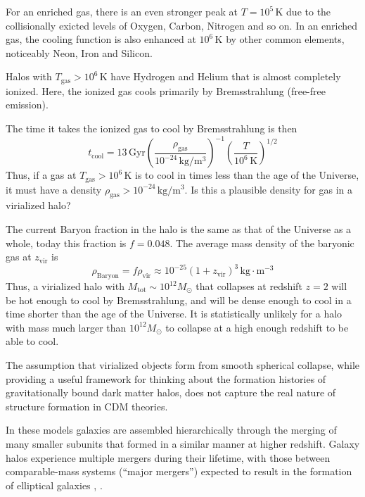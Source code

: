 \par For an enriched gas, there is an even stronger peak at $T=10^{5}\,\text{K}$ due to the collisionally exicted levels of Oxygen, Carbon, Nitrogen and so on. In an enriched gas, the cooling function is also enhanced at $10^{6}\,\text{K}$ by other common elements, noticeably
Neon, Iron and Silicon.
\par Halos with $T_{\text{gas}}>10^{6}\,\text{K}$ have Hydrogen and Helium that is almost completely ionized. Here, the ionized gas cools primarily by Bremsstrahlung (free-free emission).
\par The time it takes the ionized gas to cool by Bremsstrahlung is then 
\begin{equation}
    t_{\text{cool}} = 13\,\text{Gyr}\left(\frac{\rho_{\text{gas}}}{10^{-24}\,\text{kg}/\text{m}^{3}}\right)^{-1}\left(\frac{T}{10^{6}\,\text{K}}\right)^{1/2}
    \label{eq:Bremsstrahlungcooling}
\end{equation}
Thus, if a gas at $T_{\text{gas}}>10^{6}\,\text{K}$ is to cool in times less than the age of the Universe, it must have a density $\rho_{\text{gas}} > 10^{-24}\,\text{kg}/\text{m}^{3}$. Is this a plausible density for gas in a virialized halo?
\par The current Baryon fraction in the halo is the same as that of the Universe as a whole, today this fraction is $f = 0.048$. The average mass density of the baryonic gas at $z_{\text{vir}}$ is
\begin{equation*}
    \rho_{\text{Baryon}} = f\rho_{\text{vir}} \approx 10^{-25} (1+z_{\text{vir}})^{3}\,\text{kg}\cdot\text{m}^{-3}
\end{equation*}
Thus, a virialized halo with $M_{\text{tot}} \sim 10^{12}M_{\odot}$ that collapses at redshift $z=2$ will be hot enough to cool by Bremsstrahlung, and will be dense enough to cool in a time shorter than the age of the Universe. It is statistically unlikely for a halo with mass much larger than $10^{12}M_{\odot}$ to collapse at a high enough redshift to be able to cool.
\par The assumption that virialized objects form from smooth spherical collapse, while providing a useful framework for thinking about the formation histories of gravitationally bound dark matter halos, does not capture the real nature of structure formation in CDM theories.
\par In these models galaxies are assembled hierarchically through the merging of many smaller subunits that formed in a similar manner at higher redshift. Galaxy halos experience multiple mergers during their lifetime, with those between comparable-mass systems (“major mergers”) expected to result in the formation of elliptical galaxies \cite{1988ApJ...331..699B}, \cite{1992ARA&A..30..705B}.
